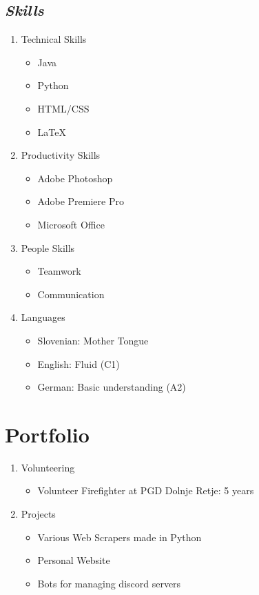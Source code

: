 \documentclass[a4paper]{article}
\begin{document}
\subsection{\emph{Skills}}
\begin{enumerate}
    \item Technical Skills
    \begin{itemize}
        \item Java
        \item Python
        \item HTML/CSS 
        \item LaTeX
    \end{itemize}
    \item Productivity Skills
    \begin{itemize}
        \item Adobe Photoshop
        \item Adobe Premiere Pro
        \item Microsoft Office
    \end{itemize}
    \item People Skills
    \begin{itemize}
        \item Teamwork
        \item Communication
    \end{itemize}
    \item Languages
    \begin{itemize}
        \item Slovenian: Mother Tongue
        \item English: Fluid (C1)
        \item German: Basic understanding (A2)
    \end{itemize}
\end{enumerate}
\pagebreak
\section{Portfolio}
\begin{enumerate}
    \item Volunteering
    \begin{itemize}
        \item Volunteer Firefighter at PGD Dolnje Retje: 5 years
    \end{itemize}
    \item Projects
    \begin{itemize}
        \item Various Web Scrapers made in Python
        \item Personal Website
        \item Bots for managing discord servers
    \end{itemize}
\end{enumerate}
\end{document}
